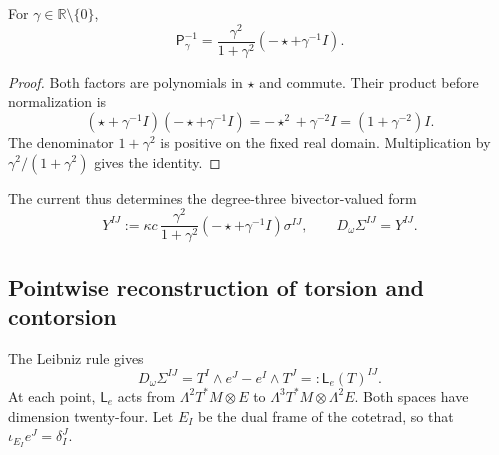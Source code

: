 \begin{lemma}
\label{vii:vii:lem:inversa-holst}
For \(\gamma\in\mathbb R\setminus\{0\}\),
\begin{equation}
 \mathsf P_\gamma^{-1}
 =\frac{\gamma^2}{1+\gamma^2}
                      (-\star+\gamma^{-1}I).
 \label{vii:vii:eq:inversa-holst}
\end{equation}
\end{lemma}
\begin{proof}
Both factors are polynomials in \(\star\) and commute. Their
product before normalization is
\[
 (\star+\gamma^{-1}I)(-\star+\gamma^{-1}I)
 =-\star^2+\gamma^{-2}I=(1+\gamma^{-2})I.
\]
The denominator \(1+\gamma^2\) is positive on the fixed real domain. Multiplication by \(\gamma^2/(1+\gamma^2)\) gives the identity.
\end{proof}

The current thus determines the degree-three bivector-valued form
\begin{equation}
 Y^{IJ}:=\kappa c\,
   \frac{\gamma^2}{1+\gamma^2}
   (-\star+\gamma^{-1}I)\sigma^{IJ},
 \qquad D_\omega\Sigma^{IJ}=Y^{IJ}.
 \label{vii:vii:eq:corriente-dualizada}
\end{equation}

\subsection{Pointwise reconstruction of torsion and contorsion}
\label{vii:vii:subsec:reconstruccion-torsion}

The Leibniz rule gives
\begin{equation}
 D_\omega\Sigma^{IJ}
 =T^I\wedge e^J-e^I\wedge T^J
 =:\mathsf L_e(T)^{IJ}.
 \label{vii:vii:eq:mapa-torsion}
\end{equation}
At each point, \(\mathsf L_e\) acts from \(\Lambda^2T^*M\otimes E\) to \(\Lambda^3T^*M\otimes\Lambda^2E\). Both spaces have dimension twenty-four. Let \(E_I\) be the dual frame of the cotetrad, so that \(\iota_{E_I}e^J=\delta_I^J\).

